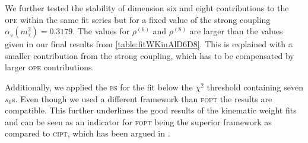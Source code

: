 \documentclass[../../index.tex]{subfiles}
\begin{document}
We further tested the stability of dimension six and eight contributions to the
\textsc{ope} within the same fit series but for a fixed value of the strong
coupling \(\alpha_s(m_\tau^2)=0.3179\). The values for \(\rho^{(6)}\) and
\(\rho^{(8)}\) are larger than the values given in our final results from
\cref{table:fitWKinAlD6D8}. This is explained with a smaller contribution from
the strong coupling, which has to be compensated by larger \textsc{ope}
contributions.

Additionally, we applied the \textsc{bs} for the fit below the \(\chi^2\)
threshold containing seven \(s_0\)s. Even though we used a different framework
than \textsc{fopt} the results are compatible. This further underlines the good
results of the kinematic weight fits and can be seen as an indicator for
\textsc{fopt} being the superior framework as compared to \textsc{cipt}, which
has been argued in \cite{Beneke2008}.
\end{document}

